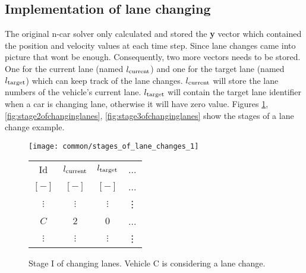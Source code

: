 		\subsection*{Implementation of lane changing}
		The original n-car solver only calculated and stored the \textbf{y} vector which contained the position and velocity values at each time step. Since lane changes came into picture that wont be enough. Consequently, two more vectors needs to be stored. One for the current lane (named $l_{\rm current}$) and one for the target lane (named $l_{\rm target}$) which can keep track of the lane changes. $l_{\rm current}$ will store the lane numbers of the vehicle's current lane. $l_{\rm target}$ will contain the target lane identifier when a car is changing lane, otherwise it will have zero value. Figures \ref{fig:stage1ofchanginglanes}, \ref{fig:stage2ofchanginglanes}, \ref{fig:stage3ofchanginglanes} show the stages of a lane change example.
		\begin{figure}[ht]
			\begin{center}
				\begin{minipage}{.65\textwidth}
					\texttt{[image: common/stages\_of\_lane\_changes\_1]}
				\end{minipage}\quad
				\begin{minipage}{.3\textwidth}
					\begin{tabular}{ |c|c|c|c| }
						\hline
						Id &  $l_{\rm current}$ & $l_{\rm target}$ & ... \\
						$[-]$ & $[-]$ & $[-]$ & ...\\
						\hline
						$\vdots$ & $\vdots$ & $\vdots$ & \vdots\\
						$C$ & $2$ & $0$ & ...\\
						$\vdots$ & $\vdots$ & $\vdots$ & \vdots\\
						\hline
					\end{tabular}
				\end{minipage}
			\end{center}
			\caption{Stage I of changing lanes. Vehicle C is considering a lane change.}
			\label{fig:stage1ofchanginglanes}
		\end{figure}
